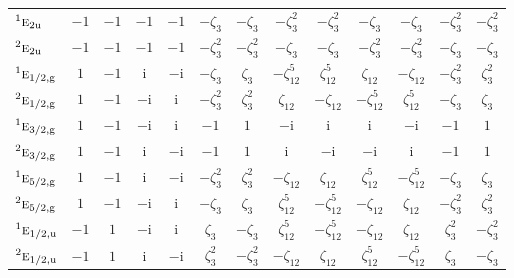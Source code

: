 \documentclass[10pt,a4paper]{article}
\makeatletter
\def\grouprule#1#2{\noalign{\marks\LTgroupmarks{\the\belowrulesep}\nobreak\vskip#1%
  \vskip\aboverulesep}\multispan\LT@cols\unskip{\leaders\hrule\@height#2\hfill\kern\z@}\cr
  \noalign{\penalty\LTrulebreak\vskip\belowrulesep\global\@lastruleclass\z@}}
\numberwithin{equation}{section}
\newcommand{\irr}[1]{\text{\normalfont\scshape #1}}
\newcommand{\conjpair}[1]{{}^{#1}}
\newcommand{\ptag}[1]{\mathrm{#1}}
\newcommand{\iunit}{\mathrm{i}}
\newcommand{\rootunity}[1]{\zeta_{#1}}
\makeatother
\begin{document}
{\begin{longtable}{@{}lcccccccccccc@{}}
$\conjpair{1}\irr{e}_{2\ptag{u}}$ & $-1$ & $-1$ & $-1$ & $-1$ & $-\rootunity{3}$ & $-\rootunity{3}$ & $-\rootunity{3}^{2}$ & $-\rootunity{3}^{2}$ & $-\rootunity{3}$ & $-\rootunity{3}$ & $-\rootunity{3}^{2}$ & $-\rootunity{3}^{2}$\\
$\conjpair{2}\irr{e}_{2\ptag{u}}$ & $-1$ & $-1$ & $-1$ & $-1$ & $-\rootunity{3}^{2}$ & $-\rootunity{3}^{2}$ & $-\rootunity{3}$ & $-\rootunity{3}$ & $-\rootunity{3}^{2}$ & $-\rootunity{3}^{2}$ & $-\rootunity{3}$ & $-\rootunity{3}$\\
\grouprule{0pt}{\lightrulewidth}
$\conjpair{1}\irr{e}_{1/2,\ptag{g}}$ & $1$ & $-1$ & $\iunit{}$ & $-\iunit{}$ & $-\rootunity{3}$ & $\rootunity{3}$ & $-\rootunity{12}^{5}$ & $\rootunity{12}^{5}$ & $\rootunity{12}$ & $-\rootunity{12}$ & $-\rootunity{3}^{2}$ & $\rootunity{3}^{2}$\\
$\conjpair{2}\irr{e}_{1/2,\ptag{g}}$ & $1$ & $-1$ & $-\iunit{}$ & $\iunit{}$ & $-\rootunity{3}^{2}$ & $\rootunity{3}^{2}$ & $\rootunity{12}$ & $-\rootunity{12}$ & $-\rootunity{12}^{5}$ & $\rootunity{12}^{5}$ & $-\rootunity{3}$ & $\rootunity{3}$\\
$\conjpair{1}\irr{e}_{3/2,\ptag{g}}$ & $1$ & $-1$ & $-\iunit{}$ & $\iunit{}$ & $-1$ & $1$ & $-\iunit{}$ & $\iunit{}$ & $\iunit{}$ & $-\iunit{}$ & $-1$ & $1$\\
$\conjpair{2}\irr{e}_{3/2,\ptag{g}}$ & $1$ & $-1$ & $\iunit{}$ & $-\iunit{}$ & $-1$ & $1$ & $\iunit{}$ & $-\iunit{}$ & $-\iunit{}$ & $\iunit{}$ & $-1$ & $1$\\
$\conjpair{1}\irr{e}_{5/2,\ptag{g}}$ & $1$ & $-1$ & $\iunit{}$ & $-\iunit{}$ & $-\rootunity{3}^{2}$ & $\rootunity{3}^{2}$ & $-\rootunity{12}$ & $\rootunity{12}$ & $\rootunity{12}^{5}$ & $-\rootunity{12}^{5}$ & $-\rootunity{3}$ & $\rootunity{3}$\\
$\conjpair{2}\irr{e}_{5/2,\ptag{g}}$ & $1$ & $-1$ & $-\iunit{}$ & $\iunit{}$ & $-\rootunity{3}$ & $\rootunity{3}$ & $\rootunity{12}^{5}$ & $-\rootunity{12}^{5}$ & $-\rootunity{12}$ & $\rootunity{12}$ & $-\rootunity{3}^{2}$ & $\rootunity{3}^{2}$\\
$\conjpair{1}\irr{e}_{1/2,\ptag{u}}$ & $-1$ & $1$ & $-\iunit{}$ & $\iunit{}$ & $\rootunity{3}$ & $-\rootunity{3}$ & $\rootunity{12}^{5}$ & $-\rootunity{12}^{5}$ & $-\rootunity{12}$ & $\rootunity{12}$ & $\rootunity{3}^{2}$ & $-\rootunity{3}^{2}$\\
$\conjpair{2}\irr{e}_{1/2,\ptag{u}}$ & $-1$ & $1$ & $\iunit{}$ & $-\iunit{}$ & $\rootunity{3}^{2}$ & $-\rootunity{3}^{2}$ & $-\rootunity{12}$ & $\rootunity{12}$ & $\rootunity{12}^{5}$ & $-\rootunity{12}^{5}$ & $\rootunity{3}$ & $-\rootunity{3}$\\

\end{longtable}}
\end{document}
